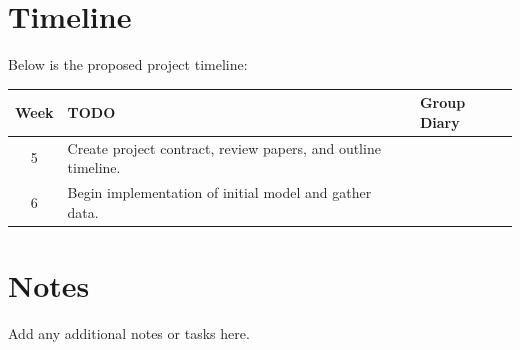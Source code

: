 \documentclass[12pt]{report}
\begin{document}
\section{Timeline}
Below is the proposed project timeline:
\vspace{1em}

\def\arraystretch{1.2} %
\noindent\begin{tabular}{|c|p{11cm}|p{4cm}|}
    \hline
    \textbf{Week} & \textbf{TODO} & \textbf{Group Diary} \\ \hline \hline
    5 & Create project contract, review papers, and outline timeline. & \\ \hline
    6 & Begin implementation of initial model and gather data. & \\ \hline
\end{tabular}

\section*{Notes}
Add any additional notes or tasks here.

 
 
\end{document}
